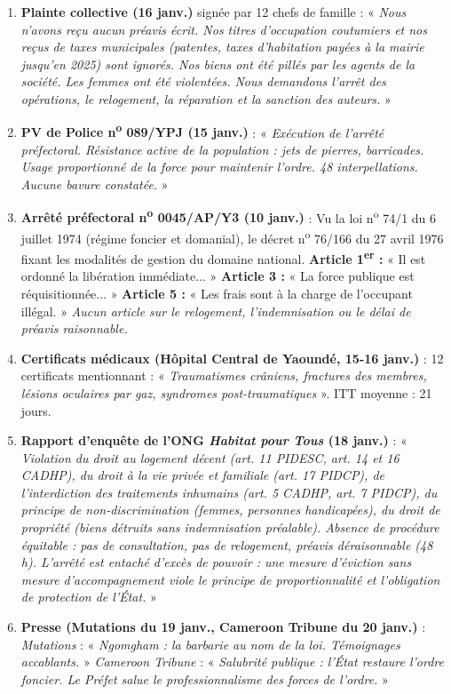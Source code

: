 \documentclass[11pt]{article}
\newcommand{\cle}[1]{{\popxbold\color{popdark}#1}}
\begin{document}
\begin{enumerate}
    \item \textbf{Plainte collective (16 janv.)} signée par 12 chefs de famille : « \emph{Nous n'avons reçu aucun préavis écrit. Nos titres d'occupation coutumiers et nos reçus de taxes municipales (patentes, taxes d'habitation payées à la mairie jusqu'en 2025) sont ignorés. Nos biens ont été pillés par les agents de la société. Les femmes ont été violentées. Nous demandons l'arrêt des opérations, le relogement, la réparation et la sanction des auteurs.} »
    \item \textbf{PV de Police n\textsuperscript{o} 089/YPJ (15 janv.)} : « \emph{Exécution de l'arrêté préfectoral. Résistance active de la population : jets de pierres, barricades. Usage proportionné de la force pour maintenir l'ordre. 48 interpellations. Aucune bavure constatée.} »
    \item \textbf{Arrêté préfectoral n\textsuperscript{o} 0045/AP/Y3 (10 janv.)} : Vu la loi n\textsuperscript{o} 74/1 du 6 juillet 1974 (régime foncier et domanial), le décret n\textsuperscript{o} 76/166 du 27 avril 1976 fixant les modalités de gestion du domaine national. \textbf{Article 1\textsuperscript{er} :} « Il est ordonné la libération immédiate... » \textbf{Article 3 :} « La force publique est réquisitionnée... » \textbf{Article 5 :} « Les frais sont à la charge de l'occupant illégal. » \emph{Aucun article sur le relogement, l'indemnisation ou le délai de préavis raisonnable.}
    \item \textbf{Certificats médicaux (Hôpital Central de Yaoundé, 15-16 janv.)} : 12 certificats mentionnant : « \emph{Traumatismes crâniens, fractures des membres, lésions oculaires par gaz, syndromes post-traumatiques} ». ITT moyenne : 21 jours.
    \item \textbf{Rapport d'enquête de l'ONG \emph{Habitat pour Tous} (18 janv.)} : « \emph{Violation du droit au logement décent (art. 11 PIDESC, art. 14 et 16 CADHP), du droit à la vie privée et familiale (art. 17 PIDCP), de l'interdiction des traitements inhumains (art. 5 CADHP, art. 7 PIDCP), du principe de non-discrimination (femmes, personnes handicapées), du droit de propriété (biens détruits sans indemnisation préalable). Absence de \cle{procédure équitable} : pas de consultation, pas de relogement, préavis déraisonnable (48 h). L'arrêté est entaché d'excès de pouvoir : une mesure d'éviction sans mesure d'accompagnement viole le \cle{principe de proportionnalité} et l'\cle{obligation de protection} de l'État.} »
    \item \textbf{Presse (Mutations du 19 janv., Cameroon Tribune du 20 janv.)} : \emph{Mutations} : « \emph{Ngomgham : la barbarie au nom de la loi. Témoignages accablants.} » \emph{Cameroon Tribune} : « \emph{Salubrité publique : l'État restaure l'ordre foncier. Le Préfet salue le professionnalisme des forces de l'ordre.} »
\end{enumerate}
\end{document}
